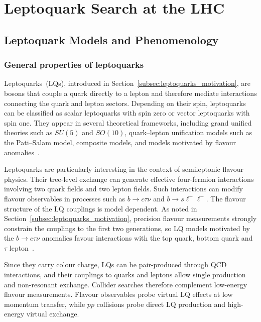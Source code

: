\chapter{Leptoquark Search at the LHC}
\label{chapter:LQ_search}

\section{Leptoquark Models and Phenomenology}
\label{sec:leptoquarks}

\subsection{General properties of leptoquarks}
\label{subsec:lq_general}

Leptoquarks~(LQs), introduced in Section~\ref{subsec:leptoquarks_motivation}, are bosons that couple a quark directly to a lepton and therefore mediate interactions connecting the quark and lepton sectors.
Depending on their spin, leptoquarks can be classified as scalar leptoquarks with spin zero or vector leptoquarks with spin one. 
They appear in several theoretical frameworks, including grand unified theories such as $SU(5)$ and $SO(10)$, quark--lepton unification models such as the Pati--Salam model, composite models, and models motivated by flavour anomalies~\cite{PatiSalam1974,GeorgiGlashow1974SU5,Dorsner2016}.


Leptoquarks are particularly interesting in the context of semileptonic flavour physics. 
Their tree-level exchange can generate effective four-fermion interactions involving two quark fields and two lepton fields. 
Such interactions can modify flavour observables in processes such as $b\rightarrow c\tau\nu$ and $b\rightarrow s\ell^{+}\ell^{-}$. 
The flavour structure of the LQ couplings is model dependent. 
As noted in Section~\ref{subsec:leptoquarks_motivation}, precision flavour measurements strongly constrain the couplings to the first two generations, so LQ models motivated by the $b\rightarrow c\tau\nu$ anomalies favour interactions with the top quark, bottom quark and $\tau$ lepton~\cite{Cornella2019}.

Since they carry colour charge, LQs can be pair-produced through QCD interactions, and their couplings to quarks and leptons allow single production and non-resonant exchange. 
Collider searches therefore complement low-energy flavour measurements. 
Flavour observables probe virtual LQ effects at low momentum transfer, while $pp$ collisions probe direct LQ production and high-energy virtual exchange.

